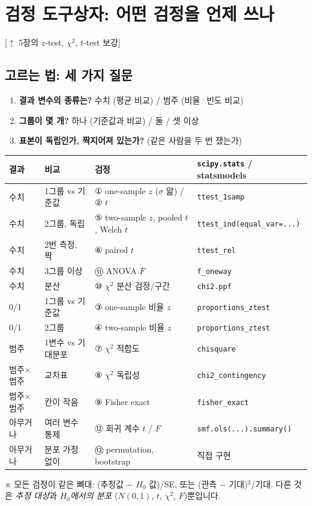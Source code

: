 \documentclass[11pt,a4paper]{article}
\newcommand{\code}[1]{\texttt{#1}}
\newcommand{\aside}[1]{{\footnotesize\color{black!65}#1}}
\newcommand{\linkup}[1]{{\footnotesize\textsf{\color{green!40!black}[$\uparrow$ #1 보강]}}}
\begin{document}
\section{검정 도구상자: 어떤 검정을 언제 쓰나}
\linkup{5장의 $z$-test, $\chi^2$, $t$-test}

\subsection{고르는 법: 세 가지 질문}
\begin{enumerate}
\item \textbf{결과 변수의 종류는?} 수치 (평균 비교) / 범주 (비율·빈도 비교)
\item \textbf{그룹이 몇 개?} 하나 (기준값과 비교) / 둘 / 셋 이상
\item \textbf{표본이 독립인가, 짝지어져 있는가?} (같은 사람을 두 번 쟀는가)
\end{enumerate}

\begin{center}\small
\begin{tabular}{@{}p{2.4cm} p{2.6cm} p{4.4cm} p{4.6cm}@{}}
\toprule
결과 & 비교 & 검정 & \code{scipy.stats} / statsmodels \\
\midrule
수치 & 1그룹 vs 기준값 & ① one-sample $z$ ($\sigma$ 앎) / ② $t$ & \code{ttest\_1samp} \\
수치 & 2그룹, 독립 & ⑤ two-sample $z$, pooled $t$, Welch $t$ & \code{ttest\_ind(equal\_var=...)} \\
수치 & 2번 측정, 짝 & ⑥ paired $t$ & \code{ttest\_rel} \\
수치 & 3그룹 이상 & ⑪ ANOVA $F$ & \code{f\_oneway} \\
수치 & 분산 & ⑩ $\chi^2$ 분산 검정/구간 & \code{chi2.ppf} \\
0/1 & 1그룹 vs 기준값 & ③ one-sample 비율 $z$ & \code{proportions\_ztest} \\
0/1 & 2그룹 & ④ two-sample 비율 $z$ & \code{proportions\_ztest} \\
범주 & 1변수 vs 기대분포 & ⑦ $\chi^2$ 적합도 & \code{chisquare} \\
범주$\times$범주 & 교차표 & ⑧ $\chi^2$ 독립성 & \code{chi2\_contingency} \\
범주$\times$범주 & 칸이 작음 & ⑨ Fisher exact & \code{fisher\_exact} \\
아무거나 & 여러 변수 통제 & ⑫ 회귀 계수 $t$ / $F$ & \code{smf.ols(...).summary()} \\
아무거나 & 분포 가정 없이 & ⑬ permutation, bootstrap & 직접 구현 \\
\bottomrule
\end{tabular}
\end{center}
\aside{※ 모든 검정이 같은 뼈대: (추정값 $-$ $H_0$ 값)/SE, 또는 (관측 $-$ 기대)$^2$/기대. 다른 것은 \emph{추정 대상}과 \emph{$H_0$에서의 분포} ($N(0,1)$, $t$, $\chi^2$, $F$)뿐입니다.}
\end{document}
